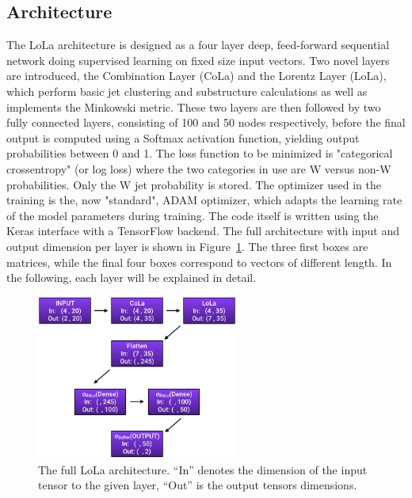 \subsection{Architecture}
The LoLa architecture is designed as a four layer deep, feed-forward sequential network doing supervised learning on fixed size input vectors.
Two novel layers are introduced, the Combination Layer (CoLa) and the Lorentz Layer (LoLa), which perform basic jet clustering and substructure calculations as well as implements the Minkowski metric.
These two layers are then followed by two fully connected layers, consisting of 100 and 50 nodes respectively, before the final output is computed using a Softmax activation function, yielding output probabilities between 0 and 1. The loss function to be minimized is "categorical crossentropy" (or log loss) where the two categories in use are W versus non-W probabilities. Only the W jet probability is stored.
The optimizer used in the training is the, now "standard", ADAM optimizer, which adapts the learning rate of the model parameters during training. The code itself is written using the Keras interface with a TensorFlow backend.
The full architecture with input and output dimension per layer is shown in Figure~\ref{fig:lola:arch}. The three first boxes are matrices, while the final four boxes correspond to vectors of different length. In the following, each layer will be explained in detail.
\begin{figure}[h!]
\centering
\includegraphics[width=0.59\textwidth]{figures/vtagging/misc/architecture.png}
\caption{The full LoLa architecture. ``In'' denotes the dimension of the input tensor to the given layer, ``Out'' is the output tensors dimensions.}
\label{fig:lola:arch}
\end{figure}


